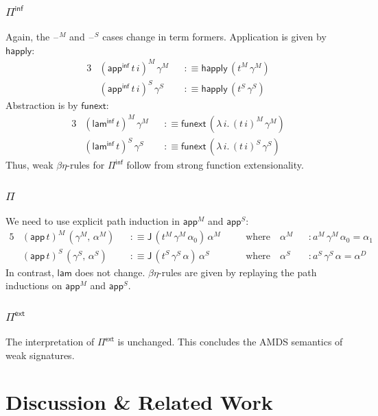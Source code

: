 \documentclass[12pt,a4paper,twoside,openany]{book}
\theoremstyle{remark}
\theoremstyle{definition}
\theoremstyle{theorem}
\newcommand{\ms}[1]{\mathsf{#1}}
\newcommand{\happly}{\ms{happly}}
\newcommand{\funext}{\ms{funext}}
\newcommand{\J}{\ms{J}}
\newcommand{\blank}{\mathord{\hspace{1pt}\text{--}\hspace{1pt}}}
\newcommand{\Pie}{\Pi^{\mathsf{ext}}}
\newcommand{\Piinf}{\Pi^{\mathsf{inf}}}
\newcommand{\appinf}{\mathsf{app^{inf}}}
\newcommand{\laminf}{\mathsf{lam^{inf}}}
\newcommand{\app}{\ms{app}}
\newcommand{\lam}{\ms{lam}}
\newcommand{\defn}{:\equiv}
\begin{document}
\subsubsection{$\ms{\Piinf}$}
Again, the $\blank^M$ and $\blank^S$ cases change in term formers. Application
is given by $\happly$:
\begin{alignat*}{3}
  &(\appinf\,t\,i)^M\,\gamma^M &&\defn \happly\,(t^M\,\gamma^M)\\
  &(\appinf\,t\,i)^S\,\gamma^S &&\defn \happly\,(t^S\,\gamma^S)
\end{alignat*}
Abstraction is by $\funext$:
\begin{alignat*}{3}
  &(\laminf\,t)^M\,\gamma^M &&\defn \funext\,(\lambda\,i.\,(t\,i)^M\,\gamma^M)\\
  &(\laminf\,t)^S\,\gamma^S &&\defn \funext\,(\lambda\,i.\,(t\,i)^S\,\gamma^S)
\end{alignat*}
Thus, weak $\beta\eta$-rules for $\Piinf$ follow from strong function extensionality.

\subsubsection{$\ms{\Pi}$}
We need to use explicit path induction in $\app^M$ and $\app^S$:
\begin{alignat*}{5}
  & (\app\,t)^M\,(\gamma^M,\,\alpha^M) &&\defn \J\,(t^M\,\gamma^M\,\alpha_0)\,\alpha^M &&\hspace{1em}\text{where}\hspace{1em} \alpha^M &&: a^M\,\gamma^M\,\alpha_0 = \alpha_1\\
  & (\app\,t)^S\,(\gamma^S,\,\alpha^S) &&\defn \J\,(t^S\,\gamma^S\,\alpha)\,\alpha^S &&\hspace{1em}\text{where}\hspace{1em} \alpha^S &&: a^S\,\gamma^S\,\alpha = \alpha^D
\end{alignat*}
In contrast, $\lam$ does not change. $\beta\eta$-rules are given by replaying
the path inductions on $\app^M$ and $\app^S$.

\subsubsection{$\ms{\Pie}$}

The interpretation of $\ms{\Pie}$ is unchanged. This concludes the AMDS semantics of weak signatures.

\section{Discussion \& Related Work}
\end{document}
